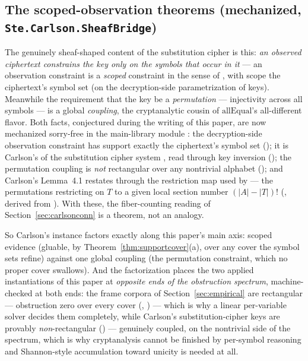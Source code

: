 \documentclass[11pt]{article}
\begin{document}
\subsection{The scoped-observation theorems (mechanized,
\texttt{Ste.Carlson.SheafBridge})}
\label{sec:scopedobs}

The genuinely sheaf-shaped content of the substitution cipher is
this: \emph{an observed ciphertext constrains the key only on the
symbols that occur in it} --- an observation constraint is a
\emph{scoped} constraint in the sense of , with
scope the ciphertext's symbol set (on the decryption-side
parametrization of keys).  Meanwhile the requirement that the key be
a \emph{permutation} --- injectivity across all symbols --- is a
global \emph{coupling}, the cryptanalytic cousin of
$\mathrm{allEqual}$'s all-different flavor.  Both facts, conjectured
during the writing of this paper, are now mechanized sorry-free in
the main-library module : the
decryption-side observation constraint  has
support exactly the ciphertext's symbol set
(); it is Carlson's
 of the substitution cipher system
, read through key inversion
(); the permutation
coupling  is \emph{not} rectangular over any
nontrivial alphabet (); and Carlson's
Lemma~4.1 restates through the restriction map used by
 --- the permutations restricting on $T$ to a
given local section number $(|A|-|T|)!$
(, derived from
).  With these, the fiber-counting
reading of Section~\ref{sec:carlsonconn} is a theorem, not an
analogy.

So Carlson's instance factors exactly along this paper's main axis:
scoped evidence (gluable, by Theorem~\ref{thm:supportcover}(a), over
any cover the symbol sets refine) against one global coupling (the
permutation constraint, which no proper cover swallows).  And the
factorization places the two applied instantiations of this paper at
\emph{opposite ends of the obstruction spectrum}, machine-checked at
both ends: the frame corpora of Section~\ref{sec:empirical} are
rectangular --- obstruction zero over every cover
(,
) --- which is why a linear per-variable
solver decides them completely, while Carlson's substitution-cipher
keys are provably \emph{non}-rectangular
() --- genuinely coupled, on the
nontrivial side of the spectrum, which is why cryptanalysis cannot
be finished by per-symbol reasoning and Shannon-style accumulation
toward unicity is needed at all.
\end{document}
